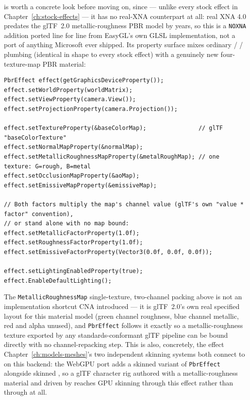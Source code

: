  is worth a concrete look before moving on, since --- unlike every stock
effect in Chapter~\ref{ch:stock-effects} --- it has no real-XNA counterpart at all: real XNA
4.0 predates the glTF~2.0 metallic-roughness PBR model by years, so this is a \texttt{NOXNA}
addition ported line for line from EasyGL's own GLSL implementation, not a port of anything
Microsoft ever shipped. Its property surface mixes ordinary /%
 /  plumbing (identical in shape to every stock
effect) with a genuinely new four-texture-map PBR material:

\begin{lstlisting}
PbrEffect effect(getGraphicsDeviceProperty());
effect.setWorldProperty(worldMatrix);
effect.setViewProperty(camera.View());
effect.setProjectionProperty(camera.Projection());

effect.setTextureProperty(&baseColorMap);               // glTF "baseColorTexture"
effect.setNormalMapProperty(&normalMap);
effect.setMetallicRoughnessMapProperty(&metalRoughMap); // one texture: G=rough, B=metal
effect.setOcclusionMapProperty(&aoMap);
effect.setEmissiveMapProperty(&emissiveMap);

// Both factors multiply the map's channel value (glTF's own "value * factor" convention),
// or stand alone with no map bound:
effect.setMetallicFactorProperty(1.0f);
effect.setRoughnessFactorProperty(1.0f);
effect.setEmissiveFactorProperty(Vector3(0.0f, 0.0f, 0.0f));

effect.setLightingEnabledProperty(true);
effect.EnableDefaultLighting();
\end{lstlisting}

The \texttt{MetallicRoughnessMap} single-texture, two-channel packing above is not an
implementation shortcut CNA introduced --- it is glTF~2.0's own real specified layout for this
material model (green channel roughness, blue channel metallic, red and alpha unused), and
\texttt{PbrEffect} follows it exactly so a metallic-roughness texture exported by any
standards-conformant glTF pipeline can be bound directly with no channel-repacking step. This
is also, concretely, the effect Chapter~\ref{ch:models-meshes}'s two independent skinning
systems both connect to on this backend: the WebGPU port adds a skinned variant of
\texttt{PbrEffect} alongside skinned , so a glTF character rig
authored with a metallic-roughness material and driven by  reaches
GPU skinning through this effect rather than through  at all.

